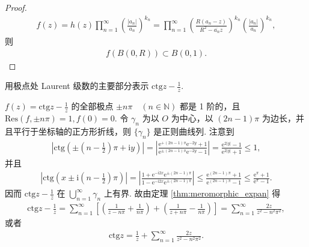 \documentclass[../../main.tex]{subfiles}%
\begin{document}
\begin{proof}
\begin{align*}
f(z) = h(z) \prod_{n=1}^\infty \left( \frac{|a_n|}{a_n} \right)^{k_n} = \prod_{n=1}^\infty \left( \frac{R(a_n - z)}{R^2 - \overline{a_n} z} \right)^{k_n} \left( \frac{|a_n|}{a_n} \right)^{k_n},
\end{align*}
则
\begin{align*}
f(B(0, R)) \subset B(0, 1).
\end{align*}
\end{proof}

\begin{example} \label{ex:cot}
用极点处 Laurent 级数的主要部分表示 \(\text{ctg} z - \frac{1}{z}\).
\end{example}
\begin{solution}
\(f(z) = \text{ctg} z - \frac{1}{z}\) 的全部极点 \(\pm n\pi \quad (n \in \mathbb{N})\) 都是 1 阶的，且 \(\mathrm{Res}(f, \pm n\pi) = 1, f(0) = 0\). 令 \(\gamma_n\) 为以 \(O\) 为中心，以 \((2n-1)\pi\) 为边长，并且平行于坐标轴的正方形折线，则 \(\{\gamma_n\}\) 是正则曲线列. 注意到
\begin{align*}
\left| \text{ctg}\left( \pm \left( n - \frac{1}{2} \right) \pi + \mathrm{i}y \right) \right| = \left| \frac{\mathrm{e}^{+(2n-1)\pi} \mathrm{e}^{-2y} + 1}{\mathrm{e}^{\pm(2n-1)\pi} \mathrm{e}^{-2y} - 1} \right| = \frac{\mathrm{e}^{2|y|} - 1}{\mathrm{e}^{2|y|} + 1} \leqslant 1,
\end{align*}
并且
\begin{align*}
\left| \text{ctg}\left( x \pm \mathrm{i}\left( n - \frac{1}{2} \right)\pi \right) \right| = \left| \frac{1 + \mathrm{e}^{-\mathrm{i}2x} \mathrm{e}^{\pm(2n-1)\pi}}{1 - \mathrm{e}^{-\mathrm{i}2x} \mathrm{e}^{\pm(2n-1)\pi}} \right| \leqslant \frac{\mathrm{e}^{(2n-1)\pi} + 1}{\mathrm{e}^{(2n-1)\pi} - 1} \leqslant \frac{\mathrm{e}^\pi + 1}{\mathrm{e}^\pi - 1}.
\end{align*}
因而 \(\text{ctg} z - \frac{1}{z}\) 在 \(\bigcup\limits_{n=1}^\infty \gamma_n\) 上有界. 故由定理 \cref{thm:meromorphic_expan} 得
\begin{align*}
\text{ctg} z - \frac{1}{z} = \sum_{n=1}^\infty \left[ \left( \frac{1}{z - n\pi} + \frac{1}{n\pi} \right) + \left( \frac{1}{z + n\pi} - \frac{1}{n\pi} \right) \right] = \sum_{n=1}^\infty \frac{2z}{z^2 - n^2\pi^2},
\end{align*}
或者
\begin{align*}
\text{ctg} z = \frac{1}{z} + \sum_{n=1}^\infty \frac{2z}{z^2 - n^2\pi^2}.
\end{align*}
\end{solution}
\end{document}
